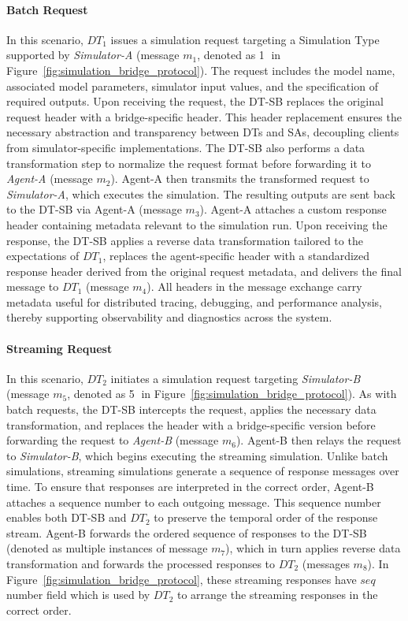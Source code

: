 \paragraph{Batch Request}
In this scenario, $DT_1$ issues a simulation request targeting a Simulation Type supported by \emph{Simulator-A} (message $m_1$, denoted as \textcircled{1} in Figure~\ref{fig:simulation_bridge_protocol}). The request includes the model name, associated model parameters, simulator input values, and the specification of required outputs.
Upon receiving the request, the DT-SB replaces the original request header with a bridge-specific header. This header replacement ensures the necessary abstraction and transparency between DTs and SAs, decoupling clients from simulator-specific implementations. The DT-SB also performs a data transformation step to normalize the request format before forwarding it to \emph{Agent-A} (message $m_2$).
Agent-A then transmits the transformed request to \emph{Simulator-A}, which executes the simulation. The resulting outputs are sent back to the DT-SB via Agent-A (message $m_3$). Agent-A attaches a custom response header containing metadata relevant to the simulation run.
Upon receiving the response, the DT-SB applies a reverse data transformation tailored to the expectations of $DT_1$, replaces the agent-specific header with a standardized response header derived from the original request metadata, and delivers the final message to $DT_1$ (message $m_4$).
All headers in the message exchange carry metadata useful for distributed tracing, debugging, and performance analysis, thereby supporting observability and diagnostics across the system.


\paragraph{Streaming Request}
In this scenario, $DT_2$ initiates a simulation request targeting \emph{Simulator-B} (message $m_5$, denoted as \textcircled{5} in Figure~\ref{fig:simulation_bridge_protocol}). As with batch requests, the DT-SB intercepts the request, applies the necessary data transformation, and replaces the header with a bridge-specific version before forwarding the request to \emph{Agent-B} (message $m_6$). Agent-B then relays the request to \emph{Simulator-B}, which begins executing the streaming simulation.
Unlike batch simulations, streaming simulations generate a sequence of response messages over time. To ensure that responses are interpreted in the correct order, Agent-B attaches a sequence number to each outgoing message. This sequence number enables both DT-SB and $DT_2$ to preserve the temporal order of the response stream.
Agent-B forwards the ordered sequence of responses to the DT-SB (denoted as multiple instances of message $m_7$), which in turn applies reverse data transformation and forwards the processed responses to $DT_2$ (messages $m_8$).
In Figure~\ref{fig:simulation_bridge_protocol}, these streaming responses have $seq$ number field which is used by $DT_2$ to arrange the streaming responses in the correct order.

